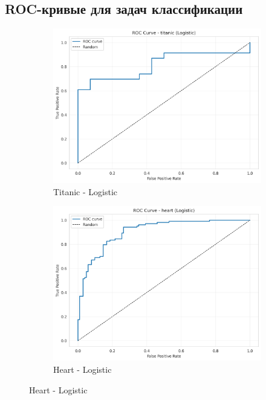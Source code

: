 \documentclass[a4paper]{article}
\begin{document}
\subsection{ROC-кривые для задач классификации}

\begin{figure}[H]
\centering
\begin{subfigure}{0.3\textwidth}
    \includegraphics[width=\textwidth]{images/roc_curve_titanic_logistic.png}
    \caption{Titanic - Logistic}
\end{subfigure}
\hfill
\begin{subfigure}{0.3\textwidth}
    \includegraphics[width=\textwidth]{images/roc_curve_heart_logistic.png}
    \caption{Heart - Logistic}
\end{subfigure}

\end{figure}
\end{document}
